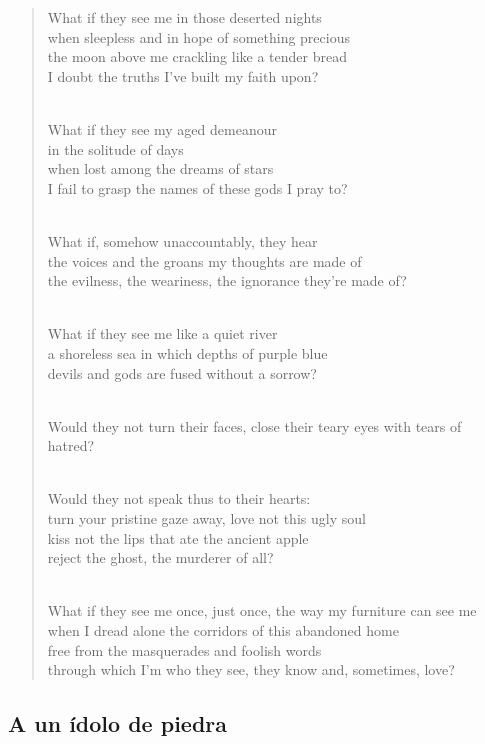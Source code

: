 \documentclass[a4paper, 12pt]{article}
\begin{document}
\begin{verse}
    
What if they see me in those deserted nights\\
when sleepless and in hope of something precious\\
the moon above me crackling like a tender bread\\
I doubt the truths I’ve built my faith upon?\\
~ 

What if they see my aged demeanour\\
in the solitude of days\\
when lost among the dreams of stars\\
I fail to grasp the names of these gods I pray to?\\
~ 

What if, somehow unaccountably, they hear\\
the voices and the groans my thoughts are made of\\
the evilness, the weariness, the ignorance they’re made of?\\
~ 

What if they see me like a quiet river\\
a shoreless sea in which depths of purple blue\\
devils and gods are fused without a sorrow?\\
~ 

Would they not turn their faces, close their teary eyes with tears of hatred?\\
~ 

Would they not speak thus to their hearts:\\
turn your pristine gaze away, love not this ugly soul\\
kiss not the lips that ate the ancient apple\\
reject the ghost, the murderer of all?\\
~ 

What if they see me once, just once, the way my furniture can see me\\
when I dread alone the corridors of this abandoned home\\
free from the masquerades and foolish words\\
through which I’m who they see, they know and, sometimes, love?\\
\end{verse}

\pagebreak

\subsection{A un ídolo de piedra}
\end{document}
